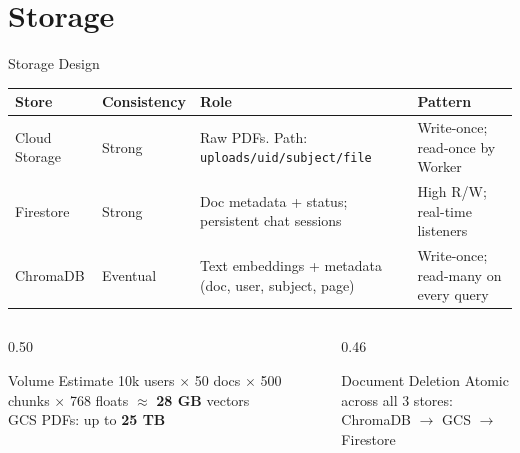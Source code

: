 \documentclass[aspectratio=169]{beamer}
\begin{document}
\section{Storage}

\begin{frame}[t,shrink=3]{Storage Design}
  \footnotesize
  \renewcommand{\arraystretch}{1.3}
  \begin{tabularx}{\textwidth}{@{}llXX@{}}
    \toprule
    \textbf{Store} & \textbf{Consistency} & \textbf{Role} & \textbf{Pattern} \\
    \midrule
    Cloud Storage  & Strong   &
      Raw PDFs. Path: \texttt{uploads/uid/subject/file} &
      Write-once; read-once by Worker \\
    Firestore      & Strong   &
      Doc metadata + status; persistent chat sessions &
      High R/W; real-time listeners \\
    ChromaDB       & Eventual &
      Text embeddings + metadata (doc, user, subject, page) &
      Write-once; read-many on every query \\
    \bottomrule
  \end{tabularx}

  \vspace{0.25cm}
  \begin{columns}[t]
    \begin{column}{0.50\textwidth}
      \begin{block}{Volume Estimate}
        {\footnotesize
        10k users $\times$ 50 docs $\times$ 500 chunks $\times$ 768 floats
        $\approx$ \textbf{28 GB} vectors\\
        GCS PDFs: up to \textbf{25 TB}}
      \end{block}
    \end{column}
    \begin{column}{0.46\textwidth}
      \begin{block}{Document Deletion}
        {\footnotesize Atomic across all 3 stores:\\
        ChromaDB $\to$ GCS $\to$ Firestore}
      \end{block}
    \end{column}
  \end{columns}
\end{frame}

\end{document}
